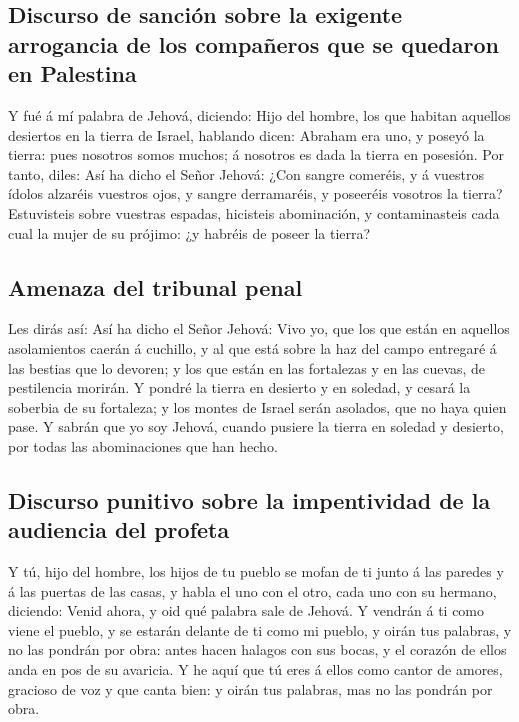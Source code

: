 \hypertarget{discurso-de-sanciuxf3n-sobre-la-exigente-arrogancia-de-los-compauxf1eros-que-se-quedaron-en-palestina}{%
\subsection{Discurso de sanción sobre la exigente arrogancia de los
compañeros que se quedaron en
Palestina}\label{discurso-de-sanciuxf3n-sobre-la-exigente-arrogancia-de-los-compauxf1eros-que-se-quedaron-en-palestina}}

 Y fué á mí palabra de Jehová, diciendo:  Hijo
del hombre, los que habitan aquellos desiertos en la tierra de Israel,
hablando dicen: Abraham era uno, y poseyó la tierra: pues nosotros somos
muchos; á nosotros es dada la tierra en posesión.  Por
tanto, diles: Así ha dicho el Señor Jehová: ¿Con sangre comeréis, y á
vuestros ídolos alzaréis vuestros ojos, y sangre derramaréis, y
poseeréis vosotros la tierra?  Estuvisteis sobre vuestras
espadas, hicisteis abominación, y contaminasteis cada cual la mujer de
su prójimo: ¿y habréis de poseer la tierra?

\hypertarget{amenaza-del-tribunal-penal}{%
\subsection{Amenaza del tribunal
penal}\label{amenaza-del-tribunal-penal}}

 Les dirás así: Así ha dicho el Señor Jehová: Vivo yo, que
los que están en aquellos asolamientos caerán á cuchillo, y al que está
sobre la haz del campo entregaré á las bestias que lo devoren; y los que
están en las fortalezas y en las cuevas, de pestilencia morirán.
 Y pondré la tierra en desierto y en soledad, y cesará la
soberbia de su fortaleza; y los montes de Israel serán asolados, que no
haya quien pase.  Y sabrán que yo soy Jehová, cuando
pusiere la tierra en soledad y desierto, por todas las abominaciones que
han hecho.

\hypertarget{discurso-punitivo-sobre-la-impentividad-de-la-audiencia-del-profeta}{%
\subsection{Discurso punitivo sobre la impentividad de la audiencia del
profeta}\label{discurso-punitivo-sobre-la-impentividad-de-la-audiencia-del-profeta}}

 Y tú, hijo del hombre, los hijos de tu pueblo se mofan de
ti junto á las paredes y á las puertas de las casas, y habla el uno con
el otro, cada uno con su hermano, diciendo: Venid ahora, y oid qué
palabra sale de Jehová.  Y vendrán á ti como viene el
pueblo, y se estarán delante de ti como mi pueblo, y oirán tus palabras,
y no las pondrán por obra: antes hacen halagos con sus bocas, y el
corazón de ellos anda en pos de su avaricia.  Y he aquí que
tú eres á ellos como cantor de amores, gracioso de voz y que canta bien:
y oirán tus palabras, mas no las pondrán por obra.

